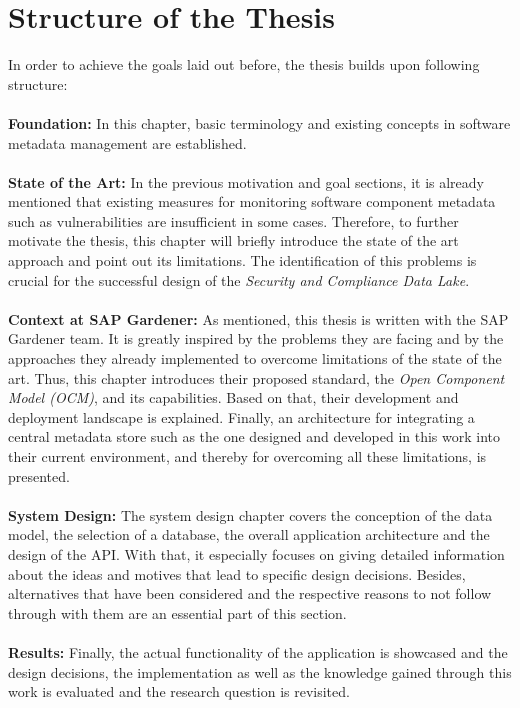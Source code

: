 \section{Structure of the Thesis}
In order to achieve the goals laid out before, the thesis builds upon following structure:\\\\
\textbf{Foundation:} In this chapter, basic terminology and existing concepts in software metadata management are established.\\\\
\textbf{State of the Art:} In the previous motivation and goal sections, it is already mentioned that existing measures for monitoring software component metadata such as vulnerabilities are insufficient in some cases. Therefore, to further motivate the thesis, this chapter will briefly introduce the state of the art approach and point out its limitations. The identification of this problems is crucial for the successful design of the \emph{Security and Compliance Data Lake}.\\\\
\textbf{Context at SAP Gardener:} As mentioned, this thesis is written with the SAP Gardener team. It is greatly inspired by the problems they are facing and by the approaches they already implemented to overcome limitations of the state of the art. Thus, this chapter introduces their proposed standard, the \emph{Open Component Model (OCM)}, and its capabilities. Based on that, their development and deployment landscape is explained. Finally, an architecture for integrating a central metadata store such as the one designed and developed in this work into their current environment, and thereby for overcoming all these limitations, is presented.\\\\
\textbf{System Design:} The system design chapter covers the conception of the data model, the selection of a database, the overall application architecture and the design of the API. With that, it especially focuses on giving detailed information about the ideas and motives that lead to specific design decisions. Besides, alternatives that have been considered and the respective reasons to not follow through with them are an essential part of this section.\\\\
\textbf{Results:} Finally, the actual functionality of the application is showcased and the design decisions, the implementation as well as the knowledge gained through this work is evaluated and the research question is revisited.


